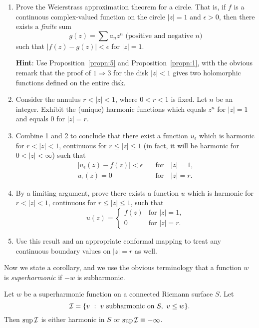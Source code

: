 \documentclass[a4paper,11pt]{article}
\begin{document}
\begin{ques}
  \label{ques:8}
  \begin{enumerate}
  \item Prove the Weierstrass approximation theorem for a circle.
    That is, if $f$ is a continuous complex-valued function on the
    circle $|z| = 1$ and $\epsilon > 0$, then there exists a
    \emph{finite} sum
    $$
    g(z) = \sum a_n z^n \text{ (positive and negative }n)
    $$
    such that $|f(z) - g(z)| < \epsilon$ for $|z| = 1$.

    \textbf{Hint}: Use Proposition~\ref{propn:5} and
    Proposition~\ref{propn:1}, with the obvious remark that the proof
    of $1 \Rightarrow 3$ for the disk $|z| < 1$ gives two holomorphic
    functions defined on the entire disk.
  \item Consider the annulus $r < |z| < 1$, where $0 < r < 1$ is
    fixed.  Let $n$ be an integer.  Exhibit the (unique) harmonic
    functions which equals $z^n$ for $|z| = 1$ and equals 0 for $|z| =
    r$. 
  \item Combine 1 and 2 to conclude that there exist a function
    $u_\epsilon$ which is harmonic for $r < |z| < 1$, continuous for
    $r \le |z| \le 1$ (in fact, it will be harmonic for $0 < |z| <
    \infty$) such that
    $$
    \begin{aligned}
      |u_\epsilon(z) - f(z)| < \epsilon & \quad\text{for}\quad |z|=1,\\
      u_\epsilon(z) = 0 & \quad\text{for}\quad |z|=r.
    \end{aligned}
    $$
  \item By a limiting argument, prove there exists a function $u$
    which is harmonic for $r < |z| < 1$, continuous for $r \le |z| \le
    1$, such that
    $$
    u(z) =
    \begin{cases}
      f(z) &\text{for } |z| = 1,\\
      0 &\text{for } |z| = r.
    \end{cases}
    $$
  \item Use this result and an appropriate conformal mapping to treat
    any continuous boundary values on $|z| = r$ as well.
  \end{enumerate}
\end{ques}

Now we state a corollary, and we use the obvious terminology that a
function $w$ is \emph{superharmonic} if $-w$ is subharmonic.

\begin{cor}
  Let $w$ be a superharmonic function on a connected Riemann surface
  $S$.  Let
  $$
  {\mathcal{I}} = \{v ~:~ v \text{ subharmonic on }S,\ v \le w\}.
  $$
  Then $\sup {\mathcal{I}}$ is either harmonic in $S$ or $\sup {\mathcal{I}} \equiv
  -\infty$. 
\end{cor}
\end{document}
